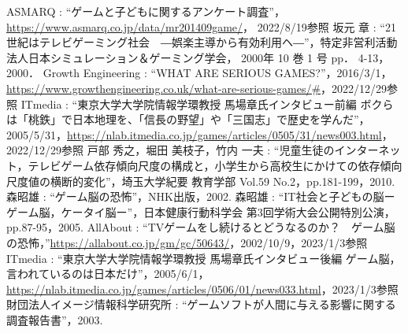 \documentclass[12pt,a4j,titlepage]{ltjsarticle}
\begin{document}
\clearpage
\begin{thebibliography}{99}
 ASMARQ : ``ゲームと子どもに関するアンケート調査''，\url{https://www.asmarq.co.jp/data/mr201409game/}， 2022/8/19参照
 坂元 章 : ``21世紀はテレビゲーミング社会　―娯楽主導から有効利用ヘ―''，特定非営利活動法人日本シミュレーション＆ゲーミング学会， 2000年 10 巻 1 号 pp． 4-13， 2000．
Growth Engineering : ``WHAT ARE SERIOUS GAMES?''，2016/3/1，\url{https://www.growthengineering.co.uk/what-are-serious-games/#}，2022/12/29参照
ITmedia : ``東京大学大学院情報学環教授 馬場章氏インタビュー前編 ボクらは「桃鉄」で日本地理を、「信長の野望」や「三国志」で歴史を学んだ''，2005/5/31，\url{https://nlab.itmedia.co.jp/games/articles/0505/31/news003.html}，2022/12/29参照
戸部 秀之，堀田 美枝子，竹内 一夫 : ``児童生徒のインターネット，テレビゲーム依存傾向尺度の構成と，小学生から高校生にかけての依存傾向尺度値の横断的変化''，埼玉大学紀要 教育学部 Vol.59 No.2，pp.181-199，2010.
森昭雄 : ``ゲーム脳の恐怖''，NHK出版，2002.
森昭雄 : ``IT社会と子どもの脳ーゲーム脳，ケータイ脳ー''，日本健康行動科学会 第3回学術大会公開特別公演，pp.87-95，2005.
AllAbout : ``TVゲームをし続けるとどうなるのか？　ゲーム脳の恐怖，''\url{https://allabout.co.jp/gm/gc/50643/}，2002/10/9，2023/1/3参照
ITmedia : ``東京大学大学院情報学環教授 馬場章氏インタビュー後編 ゲーム脳，言われているのは日本だけ''，2005/6/1，\url{https://nlab.itmedia.co.jp/games/articles/0506/01/news033.html}，2023/1/3参照
財団法人イメージ情報科学研究所 : ``ゲームソフトが人間に与える影響に関する調査報告書''，2003.
\end{thebibliography}
\end{document}
